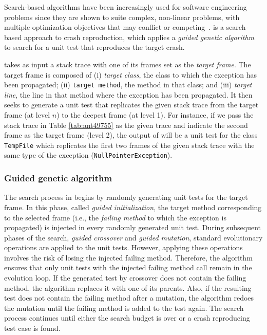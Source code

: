 Search-based algorithms have been increasingly used for software engineering problems since they are shown to suite complex, non-linear problems, with multiple optimization objectives that may conflict or competing~\cite{harman12trends}.
\evocrash \cite{soltani2017, Soltani2018a} is a search-based approach to crash reproduction, which applies a \textit{guided genetic algorithm} to search for a unit test that reproduces the target crash.

\evocrash takes as input a stack trace with one of its frames set as the \emph{target frame}. 
The target frame is composed of 
(i) \emph{target class}, the class to which the exception has been propagated;
(ii) \texttt{target method}, the method in that class; and 
(iii) \emph{target line}, the line in that method where the exception has been propagated. 
It then seeks to generate a unit test that replicates the given stack trace from the target frame (at level $n$) to the deepest frame (at level 1). 
For instance, if we pass the stack trace in Table \ref{tab:ant49755} as the given trace and indicate the second frame as the target frame (level 2), the output of \evocrash will be a unit test for the class \texttt{TempFile} which replicates the first two frames of the given stack trace with the same type of the exception (\texttt{NullPointerException}).

\subsubsection{Guided genetic algorithm}

The search process in \evocrash begins by randomly generating unit tests for the target frame.
In this phase, called \emph{guided initialization}, the target method corresponding to the selected frame (i.e., the \emph{failing method} to which the exception is propagated) is injected in every randomly generated unit test.
During subsequent phases of the search, \emph{guided crossover} and \emph{guided mutation}, standard evolutionary operations are applied to the unit tests.
However, applying these operations involves the risk of losing the injected failing method.
Therefore, the algorithm ensures that only unit tests with the injected failing method call remain in the evolution loop. 
If the generated test by crossover does not contain the failing method, the algorithm replaces it with one of its parents. 
Also, if the resulting test does not contain the failing method after a mutation, the algorithm redoes the mutation until the failing method is added to the test again.
The search process continues until either the search budget is over or a crash reproducing test case is found.

